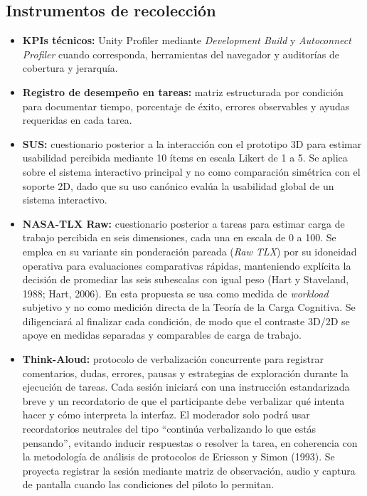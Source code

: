 \subsection{Instrumentos de recolecci\'on}

\begin{itemize}
    \item \textbf{KPIs t\'ecnicos:} Unity Profiler mediante \textit{Development Build} y \textit{Autoconnect Profiler} cuando corresponda, herramientas del navegador y auditor\'ias de cobertura y jerarqu\'ia.
    \item \textbf{Registro de desempe\~no en tareas:} matriz estructurada por condici\'on para documentar tiempo, porcentaje de \'exito, errores observables y ayudas requeridas en cada tarea.
    \item \textbf{SUS:} cuestionario posterior a la interacci\'on con el prototipo 3D para estimar usabilidad percibida mediante 10 \'items en escala Likert de 1 a 5. Se aplica sobre el sistema interactivo principal y no como comparaci\'on sim\'etrica con el soporte 2D, dado que su uso can\'onico eval\'ua la usabilidad global de un sistema interactivo.
    \item \textbf{NASA-TLX Raw:} cuestionario posterior a tareas para estimar carga de trabajo percibida en seis dimensiones, cada una en escala de 0 a 100. Se emplea en su variante sin ponderaci\'on pareada (\textit{Raw TLX}) por su idoneidad operativa para evaluaciones comparativas r\'apidas, manteniendo expl\'icita la decisi\'on de promediar las seis subescalas con igual peso (Hart y Staveland, 1988; Hart, 2006). En esta propuesta se usa como medida de \textit{workload} subjetivo y no como medici\'on directa de la Teor\'ia de la Carga Cognitiva. Se diligenciar\'a al finalizar cada condici\'on, de modo que el contraste 3D/2D se apoye en medidas separadas y comparables de carga de trabajo.
    \item \textbf{Think-Aloud:} protocolo de verbalizaci\'on concurrente para registrar comentarios, dudas, errores, pausas y estrategias de exploraci\'on durante la ejecuci\'on de tareas. Cada sesi\'on iniciar\'a con una instrucci\'on estandarizada breve y un recordatorio de que el participante debe verbalizar qu\'e intenta hacer y c\'omo interpreta la interfaz. El moderador solo podr\'a usar recordatorios neutrales del tipo ``contin\'ua verbalizando lo que est\'as pensando'', evitando inducir respuestas o resolver la tarea, en coherencia con la metodolog\'ia de an\'alisis de protocolos de Ericsson y Simon (1993). Se proyecta registrar la sesi\'on mediante matriz de observaci\'on, audio y captura de pantalla cuando las condiciones del piloto lo permitan.
\end{itemize}

